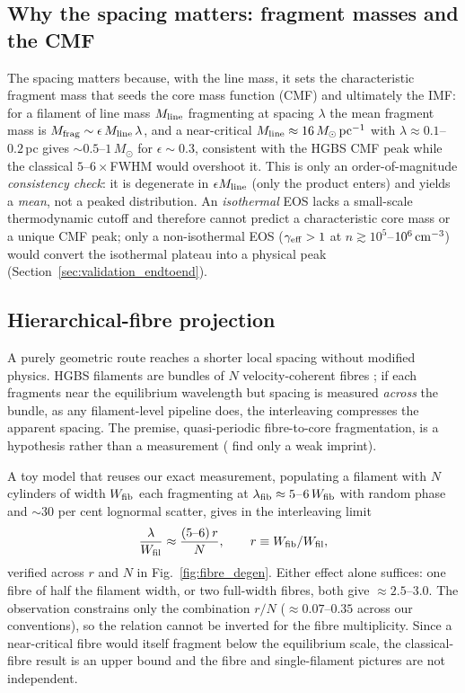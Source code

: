 \documentclass[usenatbib,twoside,twocolumn]{mnras}
\begin{document}
\subsection{Why the spacing matters: fragment masses and the CMF}
\label{sec:cmf}
The spacing matters because, with the line mass, it sets the characteristic fragment mass that seeds the core mass function (CMF) and ultimately the IMF: for a filament of line mass $M_{\rm line}$ fragmenting at spacing $\lambda$ the mean fragment mass is $M_{\rm frag}\sim\epsilon\,M_{\rm line}\,\lambda$, and a near-critical $M_{\rm line}\approx16\,M_\odot\,{\rm pc^{-1}}$ with $\lambda\approx0.1$--$0.2$\,pc gives $\sim0.5$--$1\,M_\odot$ for $\epsilon\sim0.3$, consistent with the HGBS CMF peak while the classical $5$--$6\times$FWHM would overshoot it. This is only an order-of-magnitude \emph{consistency check}: it is degenerate in $\epsilon M_{\rm line}$ (only the product enters) and yields a \emph{mean}, not a peaked distribution. An \emph{isothermal} EOS lacks a small-scale thermodynamic cutoff and therefore cannot predict a characteristic core mass or a unique CMF peak; only a non-isothermal EOS ($\gamma_{\rm eff}>1$ at $n\gtrsim10^{5}$--$10^{6}\,{\rm cm^{-3}}$) would convert the isothermal plateau into a physical peak (Section~\ref{sec:validation_endtoend}).

\subsection{Hierarchical-fibre projection}
\label{sec:fibre_projection}

A purely geometric route reaches a shorter local spacing without modified physics. HGBS filaments are bundles of $N$ velocity-coherent fibres \citep{Hacar2013,Hacar2018,Yang2024}; if each fragments near the equilibrium wavelength but spacing is measured \emph{across} the bundle, as any filament-level pipeline does, the interleaving compresses the apparent spacing. The premise, quasi-periodic fibre-to-core fragmentation, is a hypothesis rather than a measurement (\citealt{Yang2024} find only a weak imprint).

A toy model that reuses our exact measurement, populating a filament with $N$ cylinders of width $W_{\rm fib}$ each fragmenting at $\lambda_{\rm fib}\approx5$--$6\,W_{\rm fib}$ with random phase and $\sim30$ per cent lognormal scatter, gives in the interleaving limit
\begin{equation}
\frac{\lambda}{W_{\rm fil}}\approx\frac{(5\text{--}6)\,r}{N},\qquad r\equiv W_{\rm fib}/W_{\rm fil},
\label{eq:fourrn}
\end{equation}
verified across $r$ and $N$ in Fig.~\ref{fig:fibre_degen}. Either effect alone suffices: one fibre of half the filament width, or two full-width fibres, both give $\approx2.5$--$3.0$. The observation constrains only the combination $r/N$ ($\approx0.07$--$0.35$ across our conventions), so the relation cannot be inverted for the fibre multiplicity. Since a near-critical fibre would itself fragment below the equilibrium scale, the classical-fibre result is an upper bound and the fibre and single-filament pictures are not independent.
\end{document}
